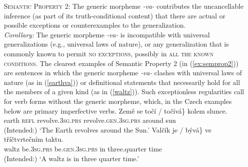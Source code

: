 \documentclass[output=paper,colorlinks,citecolor=brown]{langscibook}
\begin{document}
\eanoraggedright\label{ex:semprop2} \textsc{Semantic Property 2}: The generic morpheme \textit{-va-} contributes the uncancellable inference (as part of its truth-conditional content) that there are actual or possible exceptions or counterexamples to the generalization.\smallskip\\
\textit{Corollary:} The generic morpheme \textit{-va-} is incompatible with universal generalizations (e.g., universal laws of nature), or any generalization that is commonly known to permit \textsc{no exceptions}, possibly in \textsc{all the known conditions}.
\z
\noindent
The clearest examples of Semantic Property 2 (in (\ref{ex:semprop2})) are sentences
in which
the  generic morpheme \textit{-va-} clashes with universal laws of nature (as in (\ref{earthva})) or definitional statements that necessarily hold for all the members of a given kind (as in (\ref{waltz})). Such exceptionless regularities call for  verb forms without the generic morpheme, which, in
the Czech examples below are primary imperfective verbs.
\ea
\ea  \label{earthva}
\gll Země se	 \minsp{\{} točí /  \minsp{\#} točívá\}	kolem	slunce.	 \\
 earth 	\textsc{refl} {}	revolve.\textsc{3sg.prs}  {} {}   revolve.\textsc{gen.3sg.prs}	around	sun\\
\glt %
(Intended:) `The Earth revolves around the Sun.'
\ex \label{waltz}
\gll Valčík  \minsp{\{} je /  \minsp{{\#}} bývá\} ve tříčtvrtečním taktu.	\\
 waltz {} be.\textsc{3sg.prs} {} {}    be.\textsc{gen.3sg.prs}	in three.quarter time \\
\glt %
(Intended:) `A waltz is in three quarter time.'
\z
\z
\end{document}

